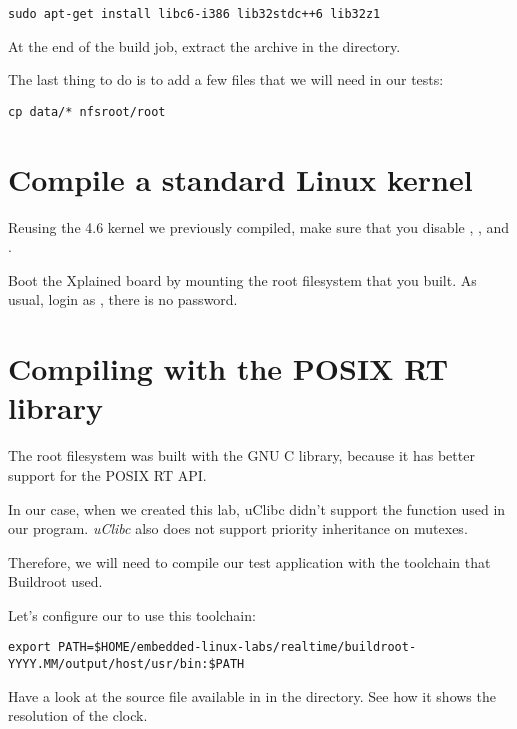 \begin{verbatim}
sudo apt-get install libc6-i386 lib32stdc++6 lib32z1
\end{verbatim}

At the end of the build job, extract the
 archive in the 
directory.

The last thing to do is to add a few files that we will need in our
tests:

\begin{verbatim}
cp data/* nfsroot/root
\end{verbatim}

\section{Compile a standard Linux kernel}

Reusing the 4.6 kernel we previously compiled, make sure that you disable
, ,
 and .

Boot the Xplained board by mounting the root filesystem that you
built. As usual, login as , there is no password.

\section{Compiling with the POSIX RT library}

The root filesystem was built with the GNU C library, because it has
better support for the POSIX RT API.

In our case, when we created this lab, uClibc didn't support the
 function used in our 
program. {\em uClibc} also does not support priority inheritance on
mutexes.

Therefore, we will need to compile our test application with the
toolchain that Buildroot used.

Let's configure our  to use this toolchain:

\scriptsize
\begin{verbatim}
export PATH=$HOME/embedded-linux-labs/realtime/buildroot-YYYY.MM/output/host/usr/bin:$PATH
\end{verbatim}
\normalsize

Have a look at the  source file available in
 in the  directory. See how it shows the
resolution of the  clock.

